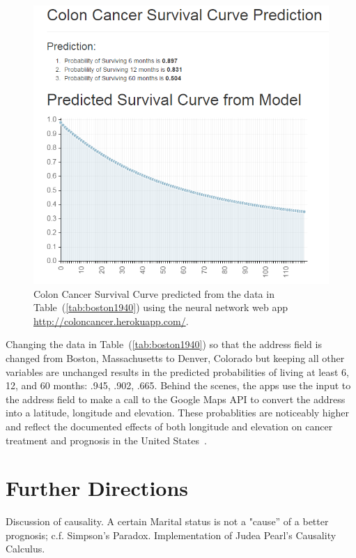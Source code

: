\documentclass[a4paper,11pt]{article}
\begin{document}
\begin{figure}[!ht]
  \centering
    \includegraphics[scale=.8]{boston1940}
\caption{\label{fig:boston1940} Colon Cancer Survival Curve predicted from the data in 
Table~(\ref{tab:boston1940}) using the neural network web app \url{http://coloncancer.herokuapp.com/}.}
\end{figure}

Changing the data in Table~(\ref{tab:boston1940}) so that the address field is changed from Boston, Massachusetts to Denver, Colorado but keeping all other variables are unchanged results in the predicted probabilities of living at least 6, 12, and 60 months: .945, .902, .665. 
Behind the scenes, the apps use the input to the address field to make a call to the Google Maps API to convert the address into a latitude, longitude and elevation.
These probablities are noticeably higher and reflect the documented effects of both longitude and elevation on cancer treatment and prognosis in the United States~\cite{kob4}.


\section{Further Directions}
\label{sec:furtherdirections}

Discussion of causality. A certain Marital status is not a "cause'' of a better prognosis; c.f. Simpson's Paradox. Implementation of Judea Pearl's Causality Calculus.
\end{document}
